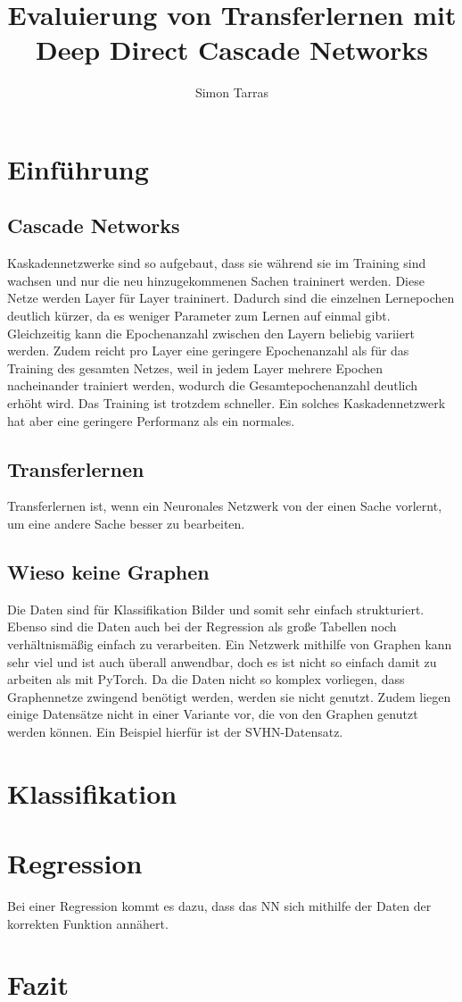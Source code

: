 \documentclass[ngerman]{report}
\title{Evaluierung von Transferlernen mit Deep Direct Cascade Networks}
\author{Simon Tarras}
\begin{document}
    \maketitle
    \tableofcontents
    \chapter{Einführung}
        \section{Cascade Networks}
        Kaskadennetzwerke sind so aufgebaut, dass sie während sie 
        im Training sind wachsen und nur die neu hinzugekommenen 
        Sachen traininert werden. \cite{cascor}
        Diese Netze werden Layer für Layer traininert. Dadurch sind die 
        einzelnen Lernepochen deutlich kürzer, da es weniger Parameter 
        zum Lernen auf einmal gibt. Gleichzeitig kann die Epochenanzahl 
        zwischen den Layern beliebig variiert werden. Zudem reicht pro 
        Layer eine geringere Epochenanzahl als für das Training des 
        gesamten Netzes, weil in jedem Layer mehrere Epochen nacheinander 
        trainiert werden, wodurch die Gesamtepochenanzahl deutlich erhöht wird. 
        Das Training ist trotzdem schneller. Ein solches Kaskadennetzwerk 
        hat aber eine geringere Performanz als ein normales. 
        \section{Transferlernen}
        Transferlernen ist, wenn ein Neuronales Netzwerk von der 
        einen Sache vorlernt, um eine andere Sache besser zu 
        bearbeiten.
        \section{Wieso keine Graphen}
        Die Daten sind für Klassifikation Bilder und somit sehr einfach strukturiert. 
        Ebenso sind die Daten auch bei der Regression als große Tabellen noch 
        verhältnismäßig einfach zu verarbeiten. 
        Ein Netzwerk mithilfe von Graphen kann sehr viel und ist auch überall anwendbar, 
        doch es ist nicht so einfach damit zu arbeiten als mit PyTorch.
        Da die Daten nicht so komplex vorliegen, dass Graphennetze zwingend benötigt 
        werden, werden sie nicht genutzt. Zudem liegen einige Datensätze nicht in einer 
        Variante vor, die von den Graphen genutzt werden können. Ein Beispiel hierfür ist 
        der SVHN-Datensatz.
    \chapter{Klassifikation}
    
    
    \chapter{Regression}
    Bei einer Regression kommt es dazu, dass das NN sich mithilfe 
    der Daten der korrekten Funktion annähert.

    \chapter{Fazit}
    \printbibliography
\end{document}
